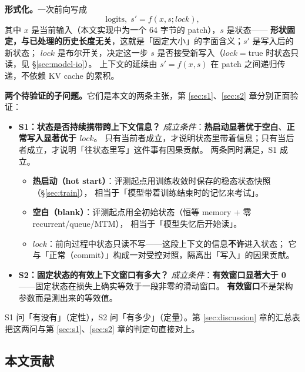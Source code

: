 \textbf{形式化。}一次前向写成
\begin{equation}
\mathrm{logits},\; s' = f(x, s; \mathit{lock}),
\label{eq:forward}
\end{equation}
其中 $x$ 是当前输入（本文实现中为一个 64 字节的 patch），$s$ 是状态——
\textbf{形状固定，与已处理的历史长度无关}，这就是「固定大小」的字面含义；$s'$ 是写入后的新状态；
$\mathit{lock}$ 是布尔开关，决定这一步 $s$ 是否接受新写入（$\mathit{lock}=\mathrm{true}$ 时状态只读，见 \S\ref{sec:model-io}）。
上下文的延续由 $s' = f(x,s)$ 在 patch 之间递归传递，不依赖 KV cache 的累积。

\textbf{两个待验证的子问题。}它们是本文的两条主张，第 \ref{sec:s1}、\ref{sec:s2} 章分别正面验证：

\begin{itemize}\itemsep4pt
\item \textbf{S1：状态是否持续携带跨上下文信息？}
\emph{成立条件}：\textbf{热启动显著优于空白}、\textbf{正常写入显著优于 $\mathit{lock}$}。
只有当前者成立，才说明状态里带着信息；只有当后者成立，才说明「往状态里写」这件事有因果贡献。
两条同时满足，S1 成立。
\begin{itemize}\itemsep2pt
\item \textbf{热启动（hot start）}：评测起点用训练收敛时保存的稳态状态快照（\S\ref{sec:train}），
      相当于「模型带着训练结束时的记忆来考试」。
\item \textbf{空白（blank）}：评测起点用全初始状态（恒等 memory + 零 recurrent/queue/MTM），
      相当于「模型失忆后开始读」。
\item \textbf{$\mathit{lock}$}：前向过程中状态只读不写——这段上下文的信息\textbf{不许}进入状态；
      它与「正常（commit）」构成一对受控对照，隔离出「写入」的因果贡献。
\end{itemize}
\item \textbf{S2：固定状态的有效上下文窗口有多大？}
\emph{成立条件}：\textbf{有效窗口显著大于 0}——固定状态在损失上确实等效于一段非零的滑动窗口。
\textbf{有效窗口}不是架构参数而是测出来的等效值。
\end{itemize}

S1 问「有没有」（定性），S2 问「有多少」（定量）。第 \ref{sec:discussion} 章的汇总表把这两问与第 \ref{sec:s1}、\ref{sec:s2} 章的判定句直接对上。

\subsection{本文贡献}\label{sec:contrib}

